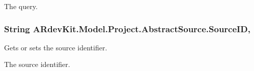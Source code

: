 The query. \hypertarget{class_a_rdev_kit_1_1_model_1_1_project_1_1_abstract_source_ad17fdcfdfb0b52e0a2780e7117fd9ffc}{
\subsubsection[{Source\-I\-D}]{\setlength{\rightskip}{0pt plus 5cm}String A\-Rdev\-Kit.\-Model.\-Project.\-Abstract\-Source.\-Source\-I\-D\hspace{0.3cm}{\ttfamily [get]}, {\ttfamily [set]}}}\label{class_a_rdev_kit_1_1_model_1_1_project_1_1_abstract_source_ad17fdcfdfb0b52e0a2780e7117fd9ffc}


Gets or sets the source identifier. 

The source identifier. 